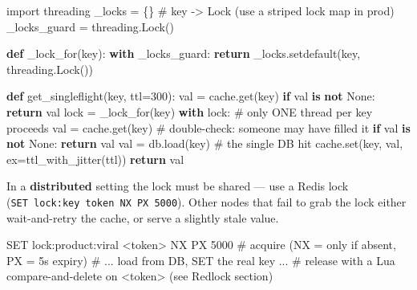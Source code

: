 \documentclass[11pt]{article}
\newenvironment{Shaded}{\begin{snugshade}}{\end{snugshade}}
\newcommand{\BuiltInTok}[1]{\textcolor[rgb]{0.50,0.55,0.55}{#1}}
\newcommand{\CommentTok}[1]{\textcolor[rgb]{0.48,0.49,0.49}{#1}}
\newcommand{\ControlFlowTok}[1]{\textcolor[rgb]{0.99,0.74,0.29}{\textbf{#1}}}
\newcommand{\DecValTok}[1]{\textcolor[rgb]{0.96,0.45,0.00}{#1}}
\newcommand{\ImportTok}[1]{\textcolor[rgb]{0.15,0.68,0.38}{#1}}
\newcommand{\KeywordTok}[1]{\textcolor[rgb]{0.81,0.81,0.76}{\textbf{#1}}}
\newcommand{\NormalTok}[1]{\textcolor[rgb]{0.81,0.81,0.76}{#1}}
\newcommand{\OperatorTok}[1]{\textcolor[rgb]{0.81,0.81,0.76}{#1}}
\newcommand{\VariableTok}[1]{\textcolor[rgb]{0.15,0.68,0.68}{#1}}
\begin{document}
\begin{Shaded}
\begin{Highlighting}[]
\ImportTok{import}\NormalTok{ threading}
\NormalTok{\_locks }\OperatorTok{=}\NormalTok{ \{\}                       }\CommentTok{\# key {-}\textgreater{} Lock (use a striped lock map in prod)}
\NormalTok{\_locks\_guard }\OperatorTok{=}\NormalTok{ threading.Lock()}

\KeywordTok{def}\NormalTok{ \_lock\_for(key):}
    \ControlFlowTok{with}\NormalTok{ \_locks\_guard:}
        \ControlFlowTok{return}\NormalTok{ \_locks.setdefault(key, threading.Lock())}

\KeywordTok{def}\NormalTok{ get\_singleflight(key, ttl}\OperatorTok{=}\DecValTok{300}\NormalTok{):}
\NormalTok{    val }\OperatorTok{=}\NormalTok{ cache.get(key)}
    \ControlFlowTok{if}\NormalTok{ val }\KeywordTok{is} \KeywordTok{not} \VariableTok{None}\NormalTok{:}
        \ControlFlowTok{return}\NormalTok{ val}
\NormalTok{    lock }\OperatorTok{=}\NormalTok{ \_lock\_for(key)}
    \ControlFlowTok{with}\NormalTok{ lock:                     }\CommentTok{\# only ONE thread per key proceeds}
\NormalTok{        val }\OperatorTok{=}\NormalTok{ cache.get(key)      }\CommentTok{\# double{-}check: someone may have filled it}
        \ControlFlowTok{if}\NormalTok{ val }\KeywordTok{is} \KeywordTok{not} \VariableTok{None}\NormalTok{:}
            \ControlFlowTok{return}\NormalTok{ val}
\NormalTok{        val }\OperatorTok{=}\NormalTok{ db.load(key)        }\CommentTok{\# the single DB hit}
\NormalTok{        cache.}\BuiltInTok{set}\NormalTok{(key, val, ex}\OperatorTok{=}\NormalTok{ttl\_with\_jitter(ttl))}
        \ControlFlowTok{return}\NormalTok{ val}
\end{Highlighting}
\end{Shaded}

In a \textbf{distributed} setting the lock must be shared --- use a Redis lock (\texttt{SET\ lock:key\ token\ NX\ PX\ 5000}). Other nodes that fail to grab the lock either wait-and-retry the cache, or serve a slightly stale value.


\begin{Shaded}
\begin{Highlighting}[]
\NormalTok{SET lock:product:viral \textless{}token\textgreater{} NX PX 5000   \# acquire (NX = only if absent, PX = 5s expiry)}
\NormalTok{\# ... load from DB, SET the real key ...}
\NormalTok{\# release with a Lua compare{-}and{-}delete on \textless{}token\textgreater{} (see Redlock section)}
\end{Highlighting}
\end{Shaded}
\end{document}
